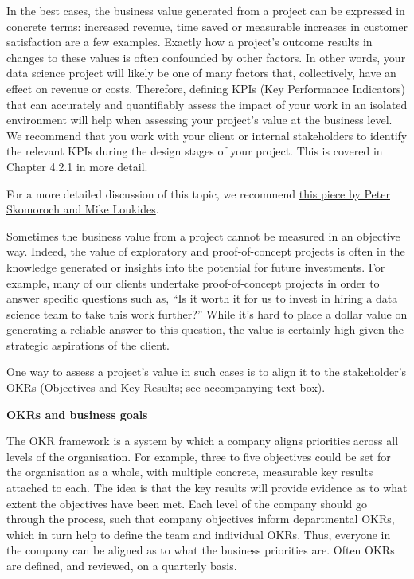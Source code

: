 \documentclass[
]{book}
\begin{document}
In the best cases, the business value generated from a project can be expressed in concrete terms: increased revenue, time saved or measurable increases in customer satisfaction are a few examples. Exactly how a project's outcome results in changes to these values is often confounded by other factors. In other words, your data science project will likely be one of many factors that, collectively, have an effect on revenue or costs. Therefore, defining KPIs (Key Performance Indicators) that can accurately and quantifiably assess the impact of your work in an isolated environment will help when assessing your project's value at the business level. We recommend that you work with your client or internal stakeholders to identify the relevant KPIs during the design stages of your project. This is covered in Chapter 4.2.1 in more detail.

For a more detailed discussion of this topic, we recommend \href{https://www.oreilly.com/radar/what-you-need-to-know-about-product-management-for-ai/}{this piece by Peter Skomoroch and Mike Loukides}.

Sometimes the business value from a project cannot be measured in an objective way. Indeed, the value of exploratory and proof-of-concept projects is often in the knowledge generated or insights into the potential for future investments. For example, many of our clients undertake proof-of-concept projects in order to answer specific questions such as, ``Is it worth it for us to invest in hiring a data science team to take this work further?'' While it's hard to place a dollar value on generating a reliable answer to this question, the value is certainly high given the strategic aspirations of the client.

One way to assess a project's value in such cases is to align it to the stakeholder's OKRs (Objectives and Key Results; see accompanying text box).

\begin{infobox}

\textbf{OKRs and business goals}

The OKR framework is a system by which a company aligns priorities across all levels of the organisation. For example, three to five objectives could be set for the organisation as a whole, with multiple concrete, measurable key results attached to each. The idea is that the key results will provide evidence as to what extent the objectives have been met. Each level of the company should go through the process, such that company objectives inform departmental OKRs, which in turn help to define the team and individual OKRs. Thus, everyone in the company can be aligned as to what the business priorities are. Often OKRs are defined, and reviewed, on a quarterly basis.

\end{infobox}
\end{document}
